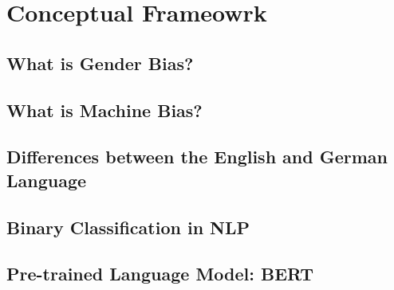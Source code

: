 \chapter{Conceptual Frameowrk}

\section{What is Gender Bias?}

\section{What is Machine Bias?}

\section{Differences between the English and German Language}

\section{Binary Classification in NLP}

\section{Pre-trained Language Model: BERT}
